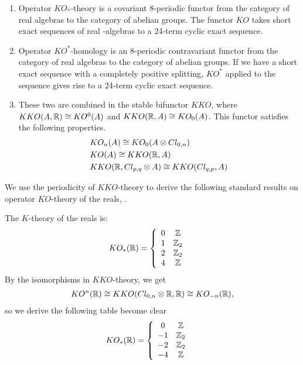\begin{theorem}
\begin{enumerate}
\item
	Operator $KO_{*}$-theory is a covariant $8$-periodic functor from the category of real \Cstar algebras to the category of abelian groups. The functor $KO$ takes short exact sequences of real \Cstar-algebras to a 24-term cyclic exact sequence. 
\item	Operator $KO^{*}$-homology is an $8$-periodic contravariant functor from the category of real \Cstar algebras to the category of abelian groups. If we have a short exact sequence with a completely positive splitting, $KO^{*}$ applied to the sequence gives rise to a 24-term cyclic exact sequence. 
	\item These two are combined in the stable bifunctor $KKO$, where $KKO(A,\mathbb{R})\cong KO^{0}(A)$ and $KKO(\mathbb{R},A)\cong KO_0(A)$. This functor satisfies the following properties.
	\begin{align*}
		&KO_n(A)\cong KO_0(A\otimes Cl_{0,n}) \\
		&KO(A)\cong KKO(\mathbb{R},A) \\
		&KKO(\mathbb{R},Cl_{p,q} \otimes A) \cong KKO(Cl_{q,p},A) 
	\end{align*}
	\end{enumerate}
\end{theorem}
We use the periodicity of $KKO$-theory to derive the following standard results on operator $KO$-theory of the reals, \cite[Section 1]{schroder}. 
\begin{example}
	The $K$-theory of the reals is: 
	\begin{align*}
		&KO_*(\mathbb{R})=\left \{\begin{array}{c c} 0 & \mathbb{Z}  \\ 1 & \mathbb{Z}_2 \\ 2 & \mathbb{Z}_2 \\  4 & \mathbb{Z}\end{array} \right .
	\end{align*}
	By the isomorphisms in $KKO$-theory, we get \begin{align*}KO^n(\mathbb{R})\cong KKO(Cl_{0,n}\otimes \mathbb{R},\mathbb{R})\cong KO_{-n}(\mathbb{R}), \end{align*} so we derive the following table 
	become clear
	\begin{align*}
		&KO_*(\mathbb{R})=\left \{ \begin{array}{c c} 0 & \mathbb{Z}  \\ -1 & \mathbb{Z}_2 \\ -2 & \mathbb{Z}_2 \\ -4 & \mathbb{Z} \end{array} \right .
	\end{align*}
\end{example}
